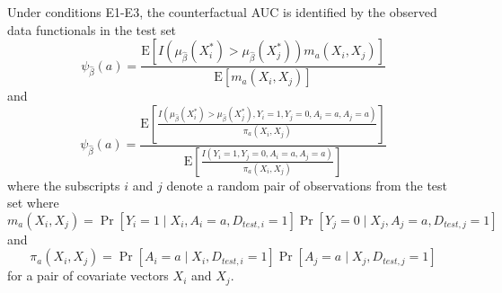 \begin{theorem}
    Under conditions E1-E3, the counterfactual AUC is identified by the observed data functionals in the test set
\begin{equation}\label{eqn:cl_auc_estimand}
    \psi_{\widehat{\beta}}(a) = \frac{\mathrm{E}\left[I\left(\mu_{\widehat{\beta}}(X_i^*)>\mu_{\widehat{\beta}}(X_j^*)\right)m_a(X_i, X_j) \right]}{\mathrm{E}\left[m_a(X_i, X_j) \right]} 
\end{equation}
and 
\begin{equation}\label{eqn:ipw_auc_estimand}
    \psi_{\widehat{\beta}}(a) = \frac{\mathrm{E}\left[\frac{I\left(\mu_{\widehat{\beta}}(X_i^*)>\mu_{\widehat{\beta}}(X_j^*), Y_i=1, Y_j=0, A_i = a, A_j = a\right)}{\pi_a(X_i, X_j)} \right]}{\mathrm{E}\left[\frac{I\left(Y_i=1, Y_j=0, A_i = a, A_j = a\right)}{\pi_a(X_i, X_j)}\right]} 
\end{equation}
where the subscripts $i$ and $j$ denote a random pair of observations from the test set where
\begin{equation*}
    m_a(X_i, X_j) = \operatorname{Pr}\left[Y_i=1 \mid X_i,A_i = a, D_{test,i} = 1\right] \Pr\left[ Y_j=0 \mid X_j, A_j = a, D_{test,j} = 1\right]
\end{equation*}
and 
\begin{equation*}
    \pi_a(X_i, X_j) = \Pr\left[A_i = a \mid X_i, D_{test,i} = 1\right] \Pr\left[A_j = a  \mid X_j, D_{test,j} = 1\right]
\end{equation*}
for a pair of covariate vectors $X_i$ and $X_j$. 
\end{theorem}

